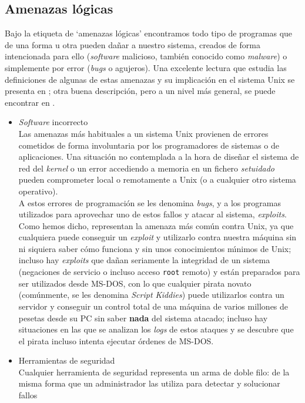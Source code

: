 \subsection{Amenazas l\'ogicas}
Bajo la etiqueta de `amenazas l\'ogicas' encontramos todo tipo de programas que
de una forma u otra pueden da\~nar a nuestro sistema, creados de forma 
intencionada para ello ({\it software} malicioso, tambi\'en conocido como {\it 
malware}) o simplemente por error ({\it bugs} o agujeros). Una excelente 
lectura que estudia las definiciones de algunas de estas amenazas y su 
implicaci\'on en el sistema Unix se presenta en \cite{kn:spa96}; otra buena
descripci\'on, pero a un nivel m\'as general, se puede encontrar en 
\cite{kn:par81}.
\begin{itemize}
\item {\it Software} incorrecto\\
Las amenazas m\'as habituales a un sistema Unix provienen de errores cometidos
de forma involuntaria por los programadores de sistemas o de aplicaciones. Una
situaci\'on no contemplada a la hora de dise\~nar el sistema de red del {\it
kernel} o un error accediendo a memoria en un fichero {\it setuidado} pueden
comprometer local o remotamente a Unix (o a cualquier otro sistema operativo).\\
A estos errores de programaci\'on se les denomina {\it bugs}, y a los 
programas utilizados para aprovechar uno de estos fallos y atacar al sistema,
{\it exploits}. Como hemos dicho, representan la amenaza m\'as com\'un contra
Unix, ya que cualquiera puede conseguir un {\it exploit} y utilizarlo contra
nuestra m\'aquina sin ni siquiera saber c\'omo funciona y sin unos conocimientos
m\'{\i}nimos de Unix; incluso hay {\it exploits} que da\~nan seriamente la
integridad de un sistema (negaciones de servicio o incluso acceso {\tt root} 
remoto) y est\'an preparados para ser utilizados desde MS-DOS, con lo que 
cualquier pirata novato (com\'unmente, se les denomina {\it Script Kiddies}) 
puede utilizarlos contra un servidor y conseguir un control total de una 
m\'aquina de varios millones de pesetas desde su PC sin saber {\bf nada} del
sistema atacado; incluso hay situaciones en las que se analizan los {\it logs} 
de estos ataques y se descubre que el pirata incluso intenta ejecutar \'ordenes
de MS-DOS.
\item Herramientas de seguridad\\
Cualquier herramienta de seguridad representa un arma de doble filo: de la 
misma forma que un administrador las utiliza para detectar y solucionar fallos

\end{itemize}
